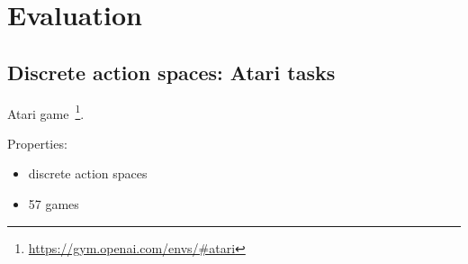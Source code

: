 \section{Evaluation}












\subsection{Discrete action spaces: Atari tasks}
Atari game~\footnote{\url{https://gym.openai.com/envs/\#atari}}.

Properties:
\begin{itemize}
\item discrete action spaces
\item 57 games
\end{itemize}

